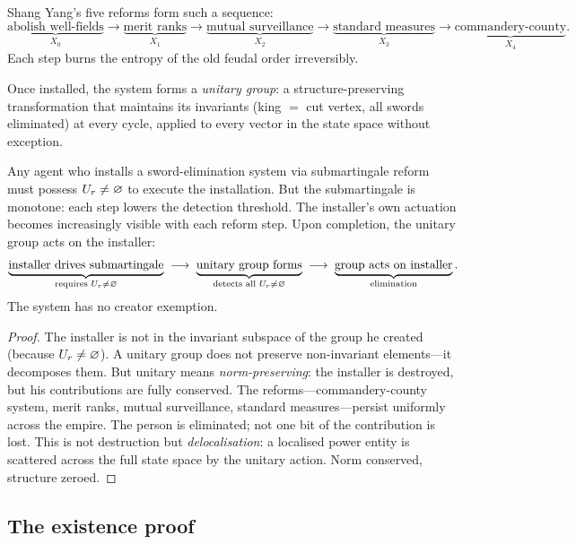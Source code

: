 Shang Yang's five reforms form such a sequence:
\[
  \underbrace{\text{abolish well-fields}}_{X_0}
  \to \underbrace{\text{merit ranks}}_{X_1}
  \to \underbrace{\text{mutual surveillance}}_{X_2}
  \to \underbrace{\text{standard measures}}_{X_3}
  \to \underbrace{\text{commandery-county}}_{X_4}.
\]
Each step burns the entropy of the old feudal order irreversibly.

Once installed, the system forms a \emph{unitary group}: a
structure-preserving transformation that maintains its invariants
(king $=$ cut vertex, all swords eliminated) at every cycle, applied
to every vector in the state space without exception.

\begin{theorem}\label{thm:shangyang}
Any agent who installs a sword-elimination system via submartingale
reform must possess $U_r \neq \varnothing$ to execute the installation.
But the submartingale is monotone: each step lowers the detection
threshold. The installer's own actuation becomes increasingly visible
with each reform step. Upon completion, the unitary group acts on the
installer:
\[
  \underbrace{\text{installer drives submartingale}}_{\text{requires }
  U_r \neq \varnothing}
  \;\longrightarrow\;
  \underbrace{\text{unitary group forms}}_{\text{detects all }
  U_r \neq \varnothing}
  \;\longrightarrow\;
  \underbrace{\text{group acts on installer}}_{\text{elimination}}.
\]
The system has no creator exemption.
\end{theorem}

\begin{proof}
The installer is not in the invariant subspace of the group he
created (because $U_r \neq \varnothing$). A unitary group does not
preserve non-invariant elements---it decomposes them. But unitary
means \emph{norm-preserving}: the installer is destroyed, but his
contributions are fully conserved. The reforms---commandery-county
system, merit ranks, mutual surveillance, standard measures---persist
uniformly across the empire. The person is eliminated; not one bit of
the contribution is lost. This is not destruction but
\emph{delocalisation}: a localised power entity is scattered across
the full state space by the unitary action. Norm conserved, structure
zeroed.
\end{proof}

\subsection{The existence proof}

